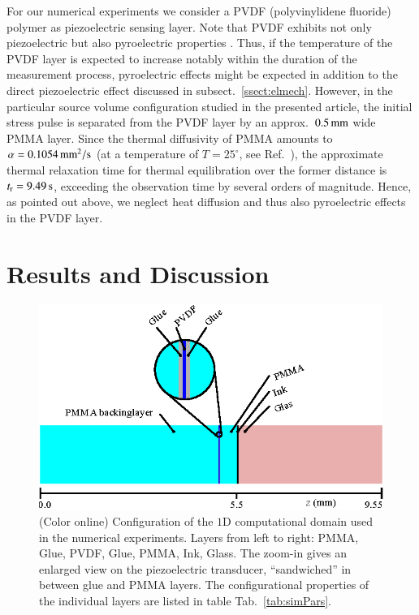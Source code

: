 \documentclass[5p,times,twocolumn]{elsarticle}
\begin{document}
For our numerical experiments we consider a PVDF (polyvinylidene fluoride)
polymer as piezoelectric sensing layer.  Note that PVDF exhibits not only
piezoelectric but also pyroelectric properties \cite{Ueberschlag:2001}.  Thus,
if the temperature of the PVDF layer is expected to increase notably within the
duration of the measurement process, pyroelectric effects might be expected in
addition to the direct piezoelectric effect discussed in subsect.\
\ref{ssect:elmech}. However, in the particular source volume configuration 
studied in the presented article, the initial stress pulse is separated from 
the PVDF layer by an approx.\ $0.5\,{\rm{mm}}$ wide PMMA layer. Since the
thermal diffusivity of PMMA amounts to $\alpha = 0.1054\,{\rm mm^2/s}$ (at a
temperature of $T=25^\circ$, see Ref.\ \cite{NunesDosSantos:2005}), the 
approximate thermal relaxation time for thermal equilibration over the 
former distance is $t_{\rm{r}}=9.49\,{\rm{s}}$, exceeding the observation 
time by several orders of magnitude. Hence, as pointed out above, we neglect
heat diffusion and thus also pyroelectric effects in the PVDF layer.

\section{Results and Discussion}
\label{sec:S4}

\begin{figure}[t!]
\begin{center}
\includegraphics[width=1.0\linewidth]{./FIGS/cfgDomain.eps}
\end{center}
\caption{
(Color online) Configuration of the $1$D computational domain used in the
numerical experiments.  Layers from left to right: PMMA, Glue, PVDF, Glue,
PMMA, Ink, Glass.  The zoom-in gives an enlarged view on the piezoelectric
transducer, ``sandwiched'' in between glue and PMMA layers.  The
configurational properties of the individual layers are listed in table Tab.\
\ref{tab:simPars}.  \label{fig:cfg}}
\end{figure}  
\end{document}
